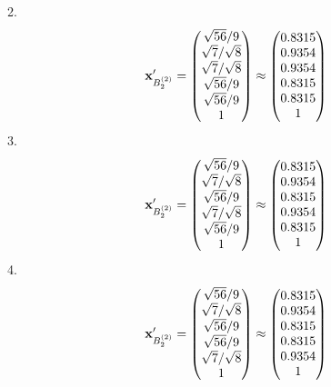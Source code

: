 \documentclass[10pt,a4paper]{article}
\begin{document}
	2.
	\[
		\bold{x}'_{B_2^{(2)}} = 
		\begin{pmatrix}
			{\sqrt{56}} / {{9}} \\
			{\sqrt{7}} / {\sqrt{8}} \\
			{\sqrt{7}} / {\sqrt{8}} \\
			{\sqrt{56}} / {{9}} \\
			{\sqrt{56}} / {{9}} \\
			{1}{} \\
		\end{pmatrix}
		\approx
		\begin{pmatrix}
			0.8315   \\
			0.9354   \\
			0.9354   \\
			0.8315   \\
			0.8315   \\
			1        \\
		\end{pmatrix}
	\]
	3.
	\[
		\bold{x}'_{B_2^{(2)}} = 
		\begin{pmatrix}
			{\sqrt{56}} / {{9}} \\
			{\sqrt{7}} / {\sqrt{8}} \\
			{\sqrt{56}} / {{9}} \\
			{\sqrt{7}} / {\sqrt{8}} \\
			{\sqrt{56}} / {{9}} \\
			{1}{} \\
		\end{pmatrix}
		\approx
		\begin{pmatrix}
			0.8315   \\
			0.9354   \\
			0.8315   \\
			0.9354   \\
			0.8315   \\
			1        \\
		\end{pmatrix}
	\]
	4.
	\[
		\bold{x}'_{B_2^{(2)}} = 
		\begin{pmatrix}
			{\sqrt{56}} / {{9}} \\
			{\sqrt{7}} / {\sqrt{8}} \\
			{\sqrt{56}} / {{9}} \\
			{\sqrt{56}} / {{9}} \\
			{\sqrt{7}} / {\sqrt{8}} \\
			{1}{} \\
		\end{pmatrix}
		\approx
		\begin{pmatrix}
			0.8315   \\
			0.9354   \\
			0.8315   \\
			0.8315   \\
			0.9354   \\
			1        \\
		\end{pmatrix}
	\]
\end{document}

